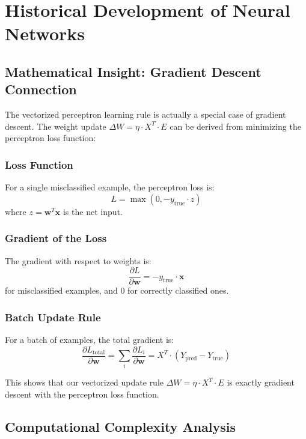 \section{Historical Development of Neural Networks}






\subsection{Mathematical Insight: Gradient Descent Connection}
The vectorized perceptron learning rule is actually a special case of gradient descent. The weight update \(\Delta W = \eta \cdot X^T \cdot E\) can be derived from minimizing the perceptron loss function:

\subsubsection{Loss Function}
For a single misclassified example, the perceptron loss is:
\[L = \max(0, -y_{\text{true}} \cdot z)\]
where \(z = \mathbf{w}^T \mathbf{x}\) is the net input.

\subsubsection{Gradient of the Loss}
The gradient with respect to weights is:
\[\frac{\partial L}{\partial \mathbf{w}} = -y_{\text{true}} \cdot \mathbf{x}\]
for misclassified examples, and 0 for correctly classified ones.

\subsubsection{Batch Update Rule}
For a batch of examples, the total gradient is:
\[\frac{\partial L_{\text{total}}}{\partial \mathbf{w}} = \sum_{i} \frac{\partial L_i}{\partial \mathbf{w}} = X^T \cdot (Y_{\text{pred}} - Y_{\text{true}})\]

This shows that our vectorized update rule \(\Delta W = \eta \cdot X^T \cdot E\) is exactly gradient descent with the perceptron loss function.

\subsection{Computational Complexity Analysis}
